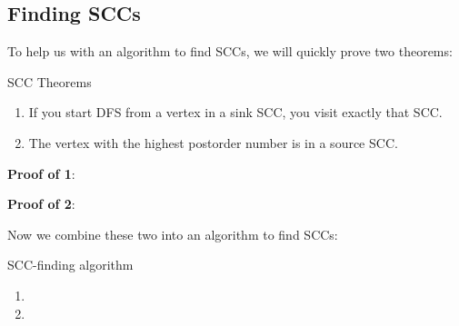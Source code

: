 \documentclass{article}
\begin{document}
\newpage
\subsection{Finding SCCs}

To help us with an algorithm to find SCCs, we will quickly prove two theorems:

\begin{theorem}{SCC Theorems}
\begin{enumerate}
    \item If you start DFS from a vertex in a sink SCC, you visit exactly that SCC.
    \item The vertex with the highest postorder number is in a source SCC.
\end{enumerate}
\end{theorem}

\textbf{Proof of 1}: 
\vspace{2cm}

\textbf{Proof of 2}: 

\vspace{3cm}

Now we combine these two into an algorithm to find SCCs:

\begin{strategy}{SCC-finding algorithm}
\begin{enumerate}
    \item 
    \item
\end{enumerate}
\vspace{3mm}
\end{strategy}
    
\vspace{3cm}
\end{document}
